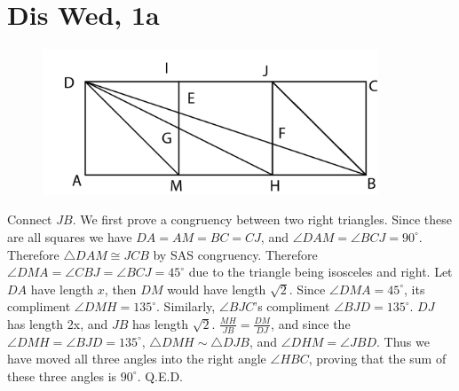 \documentclass[12pt]{article}
\newcommand{\degrees}{^{\circ}}
\begin{document}
\section{Dis Wed, 1a}
\begin{figure}[h]
    \includegraphics[width = 100mm]{GRAPH4.png}
\end{figure}
Connect $JB$.
\newline
We first prove a congruency between two right triangles. Since these are all squares we have $DA = AM = BC = CJ$, and $\angle DAM = \angle BCJ = 90 \degrees$. Therefore $\triangle DAM \cong JCB$ by SAS congruency.
\newline
Therefore $\angle DMA = \angle CBJ = \angle BCJ = 45 \degrees$ due to the triangle being isosceles and right. Let $DA$ have length $x$, then $DM$ would have length $\sqrt 2$. Since $\angle DMA = 45 \degrees$, its compliment $\angle DMH = 135 \degrees$. Similarly, $\angle BJC$'s compliment $\angle BJD = 135 \degrees$. $DJ$ has length 2x, and $JB$ has length $\sqrt 2$.
\newline
$\frac{MH}{JB} = \frac{DM}{DJ}$, and since the $\angle DMH = \angle BJD = 135 \degrees$, $\triangle DMH \sim \triangle DJB$, and $\angle DHM = \angle JBD$.
\newline
Thus we have moved all three angles into the right angle $\angle HBC$, proving that the sum of these three angles is $90 \degrees$. Q.E.D.
\newpage
\end{document}
